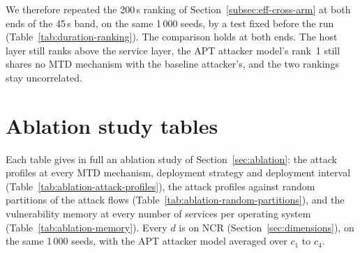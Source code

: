 \documentclass{cshonours}
\begin{document}


We therefore repeated the 200\,s ranking of Section~\ref{subsec:eff-cross-arm}
at both ends of the 45\,s band, on the same 1\,000 seeds, by a test fixed
before the run (Table~\ref{tab:duration-ranking}). The comparison holds at both
ends. The host layer still ranks above the service layer, the APT attacker
model's rank~1 still shares no MTD mechanism with the baseline attacker's, and
the two rankings stay uncorrelated.



\FloatBarrier

\clearpage
\section{Ablation study tables}
\label{app:sup-ablations}

Each table gives in full an ablation study of Section~\ref{sec:ablation}:
the attack profiles at every MTD mechanism,
deployment strategy and deployment interval (Table~\ref{tab:ablation-attack-profiles}),
the attack profiles against random partitions of the attack flows
(Table~\ref{tab:ablation-random-partitions}), and the vulnerability memory at
every number of services per operating system (Table~\ref{tab:ablation-memory}).
Every $d$ is on NCR (Section~\ref{sec:dimensions}), on the same 1\,000 seeds,
with the APT attacker model averaged over $c_1$ to $c_4$.




\end{document}
